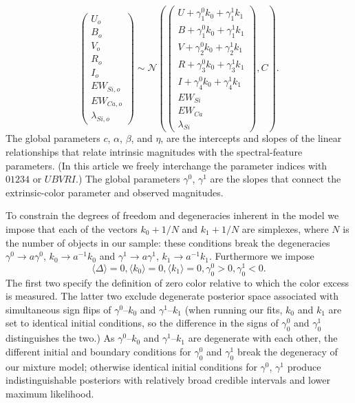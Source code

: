 \documentclass{aastex61}   	%
\begin{document}
\begin{equation}
\begin{pmatrix}
U_o\\B_o\\ V_o\\R_o\\I_o\\EW_{Si, o}\\ EW_{Ca, o} \\ \lambda_{Si, o}
\end{pmatrix}
\sim \mathcal{N}
\left(
\begin{pmatrix}
U +\gamma^0_{1} k_0 +\gamma^1_{1} k_1 \\B +\gamma^0_{1} k_0 +\gamma^1_{1} k_1 \\
V+\gamma^0_{2} k_0+\gamma^1_{2} k_1\\R+\gamma^0_{3} k_0 + \gamma^1_{3} k_1\\I+\gamma^0_{4} k_0+\gamma^1_{4} k_1\\
EW_{Si}\\ EW_{Ca} \\ \lambda_{Si}
\end{pmatrix}
,C
\right).
\label{dust:eqn}
\end{equation}
The global parameters $c$, $\alpha$, $\beta$,  and $\eta$,  are the intercepts and slopes of the linear relationships that
relate intrinsic magnitudes with the spectral-feature parameters.
(In this article we freely interchange the parameter indices with  $01234$ or $UBVRI$.)
The global parameters $\gamma^0$, $\gamma^1$  are the slopes that connect the extrinsic-color
parameter and observed magnitudes.

To constrain the degrees of freedom and degeneracies inherent in the model we impose that
\color{red}
each of the vectors $k_0+1/N$ and $k_1+1/N$ are simplexes, where $N$ is the number of objects in our sample: these
conditions break the 
degeneracies  $\gamma ^0\rightarrow a\gamma^0$, $k_0 \rightarrow a^{-1}k_0$ and $\gamma^1 \rightarrow a\gamma^1$, $k_1 \rightarrow a^{-1}k_1$.
Furthermore we impose
\color{black} 
\begin{equation}
\langle \Delta \rangle=0, \langle k_0 \rangle=0, \langle k_1 \rangle=0, \gamma^0_0 > 0, \gamma^1_0 < 0.
\end{equation}
The first two specify the definition of zero color relative to which the color excess is measured.    The latter two exclude degenerate posterior space
associated
with  simultaneous sign flips of
$\gamma^0$--$k_0$ and $\gamma^1$--$k_1$
\color{red}
(when running our fits, $k_0$ and $k_1$ are set to
identical initial conditions, so the difference in the signs of $\gamma^0_0$ and $\gamma^1_0$ distinguishes the two.)
As  $\gamma^0$--$k_0$ and $\gamma^1$--$k_1$ are degenerate with
each other,
the different initial and boundary conditions for $\gamma^0_0$ and $\gamma^1_0$ break the degeneracy of our mixture model;
otherwise identical initial conditions for $\gamma^0$, $\gamma^1$ produce indistinguishable posteriors
with relatively broad credible intervals and lower maximum likelihood.
\end{document}
